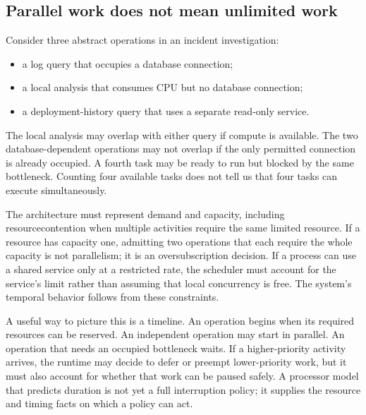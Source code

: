 
\subsection{Parallel work does not mean unlimited work}
\label{sec:ch16-epic-parallel}

Consider three abstract operations in an incident investigation:

\begin{itemize}
  \item a log query that occupies a database connection;
  \item a local analysis that consumes CPU but no database connection;
  \item a deployment-history query that uses a separate read-only service.
\end{itemize}

The local analysis may overlap with either query if compute is available. The two database-dependent operations may not overlap if the only permitted connection is already occupied. A fourth task may be ready to run but blocked by the same bottleneck. Counting four available tasks does not tell us that four tasks can execute simultaneously.

The architecture must represent demand and capacity, including \gls{resourcecontention} when multiple activities require the same limited resource. If a resource has capacity one, admitting two operations that each require the whole capacity is not parallelism; it is an oversubscription decision. If a process can use a shared service only at a restricted rate, the scheduler must account for the service's limit rather than assuming that local concurrency is free. The system's temporal behavior follows from these constraints.

A useful way to picture this is a timeline. An operation begins when its required resources can be reserved. An independent operation may start in parallel. An operation that needs an occupied bottleneck waits. If a higher-priority activity arrives, the runtime may decide to defer or preempt lower-priority work, but it must also account for whether that work can be paused safely. A processor model that predicts duration is not yet a full interruption policy; it supplies the resource and timing facts on which a policy can act.

